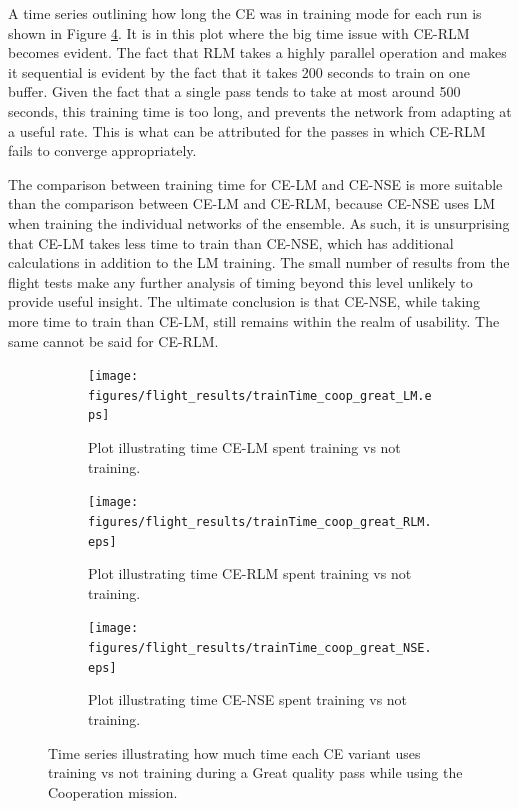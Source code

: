 \clearpage

\par A time series outlining how long the CE was in training mode for each run is shown in Figure \ref{fig:trainingTimeSeries}. It is in this plot where the big time issue with CE-RLM becomes evident. The fact that RLM takes a highly parallel operation and makes it sequential is evident by the fact that it takes 200 seconds to train on one buffer. Given the fact that a single pass tends to take at most around 500 seconds, this training time is too long, and prevents the network from adapting at a useful rate. This is what can be attributed for the passes in which CE-RLM fails to converge appropriately.
\par The comparison between training time for CE-LM and CE-NSE is more suitable than the comparison between CE-LM and CE-RLM, because CE-NSE uses LM when training the individual networks of the ensemble. As such, it is unsurprising that CE-LM takes less time to train than CE-NSE, which has additional calculations in addition to the LM training. The small number of results from the flight tests make any further analysis of timing beyond this level unlikely to provide useful insight. The ultimate conclusion is that CE-NSE, while taking more time to train than CE-LM, still remains within the realm of usability. The same cannot be said for CE-RLM. 

\begin{figure}[h]
\begin{subfigure}{\linewidth}
\centering
\texttt{[image: figures/flight\_results/trainTime\_coop\_great\_LM.eps]}
\caption{Plot illustrating time CE-LM spent training vs not training.}
\label{fig:flightCoopGreatMeanMed}
\end{subfigure} 
\begin{subfigure}{\linewidth}
\centering
\texttt{[image: figures/flight\_results/trainTime\_coop\_great\_RLM.eps]}
\caption{Plot illustrating time CE-RLM spent training vs not training.}
\label{fig:flightCoopGoodMeanMed}
\end{subfigure}
\begin{subfigure}{\linewidth}
\centering
\texttt{[image: figures/flight\_results/trainTime\_coop\_great\_NSE.eps]}
\caption{Plot illustrating time CE-NSE spent training vs not training.}
\label{fig:flightCoopGoodUnweightSum}
\end{subfigure}

\caption{Time series illustrating how much time each CE variant uses training vs not training during a Great quality pass while using the Cooperation mission.}
\label{fig:trainingTimeSeries}
\end{figure}

